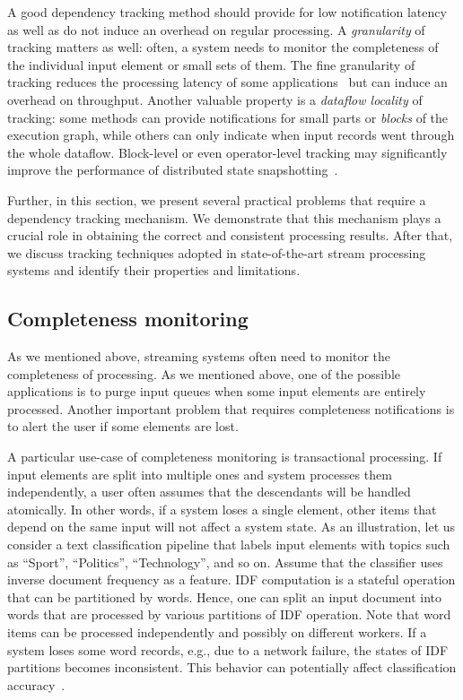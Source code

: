 A good dependency tracking method should provide for low notification latency as well as do not induce an overhead on regular processing. A {\em granularity} of tracking matters as well: often, a system needs to monitor the completeness of the individual input element or small sets of them. The fine granularity of tracking reduces the processing latency of some applications~\cite{we2018adbis} but can induce an overhead on throughput. Another valuable property is a {\em dataflow locality} of tracking: some methods can provide notifications for small parts or {\em blocks} of the execution graph, while others can only indicate when input records went through the whole dataflow. Block-level or even operator-level tracking may significantly improve the performance of distributed state snapshotting~\cite{Carbone:2017:SMA:3137765.3137777, 2015arXiv150608603C}.

Further, in this section, we present several practical problems that require a dependency tracking mechanism. We demonstrate that this mechanism plays a crucial role in obtaining the correct and consistent processing results. After that, we discuss tracking techniques adopted in state-of-the-art stream processing systems and identify their properties and limitations. 

\subsection{Completeness monitoring}
As we mentioned above, streaming systems often need to monitor the completeness of processing. As we mentioned above, one of the possible applications is to purge input queues when some input elements are entirely processed. Another important problem that requires completeness notifications is to alert the user if some elements are lost.

A particular use-case of completeness monitoring is transactional processing. If input elements are split into multiple ones and system processes them independently, a user often assumes that the descendants will be handled atomically. In other words, if a system loses a single element, other items that depend on the same input will not affect a system state. As an illustration, let us consider a text classification pipeline that labels input elements with topics such as ``Sport'', ``Politics'', ``Technology'', and so on. Assume that the classifier uses inverse document frequency as a feature. IDF computation is a stateful operation that can be partitioned by words. Hence, one can split an input document into words that are processed by various partitions of IDF operation. Note that word items can be processed independently and possibly on different workers. If a system loses some word records, e.g., due to a network failure, the states of IDF partitions becomes inconsistent. This behavior can potentially affect classification accuracy~\cite{webirte}.

